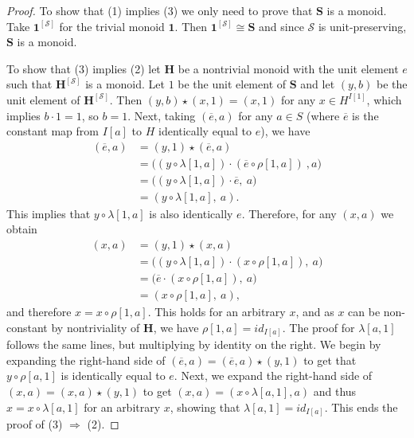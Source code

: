 \documentclass{amsart}
\begin{document}
\begin{proof}
To show that (1) implies (3) we only need to prove that $\mathbf{S}$ is a monoid.  
Take $\mathbf{1}^{[\mathcal{S}]}$ for the
trivial monoid $\mathbf{1}$. Then $\mathbf{1}^{[\mathcal{S}]} \cong \mathbf{S}$
and since $\mathcal{S}$ is unit-preserving, $\mathbf{S}$ is a monoid.  

To show that (3) implies (2) let     
$\mathbf{H}$ be a nontrivial monoid with the unit element $e$ such that
$\mathbf{H}^{[\mathcal{S}]}$ is a monoid. Let $1$ be the unit element of
$\mathbf{S}$ and let 
$(y,b)$ be the unit element of $\mathbf{H}^{[\mathcal{S}]}$.
Then $(y,b)\star(x,1) = (x,1)$
for any $x\in H^{I[1]}$, which implies $b\cdot 1 = 1$, so
$b = 1$. Next, taking $(\overline{e},a)$ for any $a\in S$ (where $\overline{e}$
is the constant map from $I[a]$ to $H$ identically equal to $e$), we have
\begin{align*}
  (\overline{e},a) &= (y,1)\star(\overline{e},a)\\
  &= \bigl((y\circ\lambda[1,a])\cdot(\overline{e}\circ\rho[1,a])\
                   ,a\bigr)\\ 
      &= \bigl((y\circ\lambda[1,a])\cdot\overline{e},\ a\bigr)\\
      &= (y\circ\lambda[1,a],\ a).
\end{align*}
This implies that $y\circ\lambda[1,a]$ is also identically $e$.
Therefore, for any $(x,a)$ we obtain
\begin{align*}
(x,a) &= (y,1)\star(x,a)\\
      &= \bigl((y\circ\lambda[1,a])\cdot(x\circ\rho[1,a]),\ a\bigr)\\
      &= \bigl(\overline{e}\cdot(x\circ\rho[1,a]),\ a\bigr)\\
      &= (x\circ\rho[1,a],\ a),
\end{align*}
and therefore $x = x\circ\rho[1,a]$. This holds for an arbitrary $x$,
and as $x$ can be non-constant by nontriviality of $\mathbf{H}$, 
we have $\rho[1,a] = {id}_{I[a]}$. The proof for $\lambda[a,1]$
follows the same lines, but multiplying by identity on the right.
We begin by expanding the right-hand side of
$(\overline{e}, a) = (\overline{e}, a)\star
(y,1)$ to get that $y\circ \rho[a,1]$ is identically equal to $e$.  
Next, we expand the right-hand side of $(x,a) = (x,a)\star(y,1)$
to get $(x,a) = (x\circ\lambda[a,1], a)$ and thus
$x = x\circ\lambda[a,1]$ for an arbitrary $x$, showing that
$\lambda[a,1] = id_{I[a]}$. This ends the proof of (3) $\Rightarrow$ (2). 


\end{proof}
\end{document}
